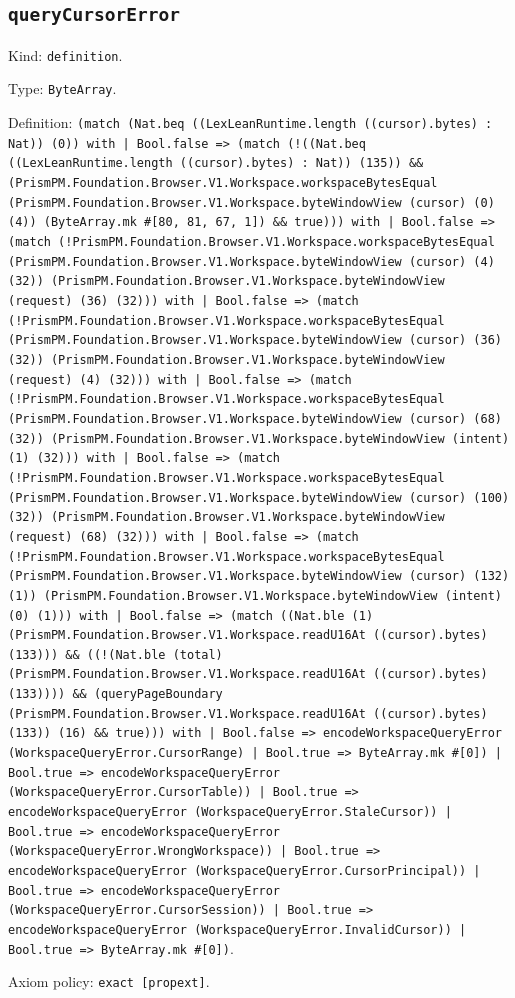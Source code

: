 \documentclass[11pt]{article}
\begin{document}
\subsection*{\texttt{queryCursorError}}
\noindent Kind: \texttt{definition}.\par
\noindent Type: \texttt{ByteArray}.\par
\noindent Definition: \texttt{(match (Nat.beq ((LexLeanRuntime.length ((cursor).bytes) : Nat)) (0)) with | Bool.false => (match (!((Nat.beq ((LexLeanRuntime.length ((cursor).bytes) : Nat)) (135)) \&\& (PrismPM.Foundation.Browser.V1.Workspace.workspaceBytesEqual (PrismPM.Foundation.Browser.V1.Workspace.byteWindowView (cursor) (0) (4)) (ByteArray.mk \#[80, 81, 67, 1]) \&\& true))) with | Bool.false => (match (!PrismPM.Foundation.Browser.V1.Workspace.workspaceBytesEqual (PrismPM.Foundation.Browser.V1.Workspace.byteWindowView (cursor) (4) (32)) (PrismPM.Foundation.Browser.V1.Workspace.byteWindowView (request) (36) (32))) with | Bool.false => (match (!PrismPM.Foundation.Browser.V1.Workspace.workspaceBytesEqual (PrismPM.Foundation.Browser.V1.Workspace.byteWindowView (cursor) (36) (32)) (PrismPM.Foundation.Browser.V1.Workspace.byteWindowView (request) (4) (32))) with | Bool.false => (match (!PrismPM.Foundation.Browser.V1.Workspace.workspaceBytesEqual (PrismPM.Foundation.Browser.V1.Workspace.byteWindowView (cursor) (68) (32)) (PrismPM.Foundation.Browser.V1.Workspace.byteWindowView (intent) (1) (32))) with | Bool.false => (match (!PrismPM.Foundation.Browser.V1.Workspace.workspaceBytesEqual (PrismPM.Foundation.Browser.V1.Workspace.byteWindowView (cursor) (100) (32)) (PrismPM.Foundation.Browser.V1.Workspace.byteWindowView (request) (68) (32))) with | Bool.false => (match (!PrismPM.Foundation.Browser.V1.Workspace.workspaceBytesEqual (PrismPM.Foundation.Browser.V1.Workspace.byteWindowView (cursor) (132) (1)) (PrismPM.Foundation.Browser.V1.Workspace.byteWindowView (intent) (0) (1))) with | Bool.false => (match ((Nat.ble (1) (PrismPM.Foundation.Browser.V1.Workspace.readU16At ((cursor).bytes) (133))) \&\& ((!(Nat.ble (total) (PrismPM.Foundation.Browser.V1.Workspace.readU16At ((cursor).bytes) (133)))) \&\& (queryPageBoundary (PrismPM.Foundation.Browser.V1.Workspace.readU16At ((cursor).bytes) (133)) (16) \&\& true))) with | Bool.false => encodeWorkspaceQueryError (WorkspaceQueryError.CursorRange) | Bool.true => ByteArray.mk \#[0]) | Bool.true => encodeWorkspaceQueryError (WorkspaceQueryError.CursorTable)) | Bool.true => encodeWorkspaceQueryError (WorkspaceQueryError.StaleCursor)) | Bool.true => encodeWorkspaceQueryError (WorkspaceQueryError.WrongWorkspace)) | Bool.true => encodeWorkspaceQueryError (WorkspaceQueryError.CursorPrincipal)) | Bool.true => encodeWorkspaceQueryError (WorkspaceQueryError.CursorSession)) | Bool.true => encodeWorkspaceQueryError (WorkspaceQueryError.InvalidCursor)) | Bool.true => ByteArray.mk \#[0])}.\par
\noindent Axiom policy: \texttt{exact [propext]}.\par
\end{document}
